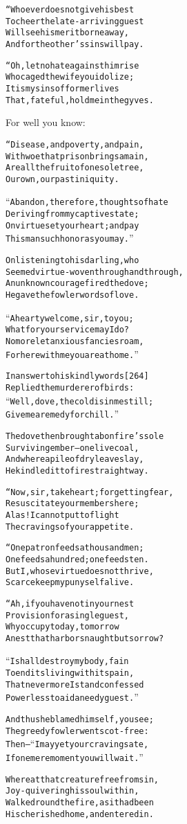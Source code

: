 \documentclass{article}
\renewenvironment{verbatim}{\begin{alltt}\normalfont\begin{centering}}{\end{centering}\end{alltt}}
\begin{document}
\begin{verbatim}
“Whoever does not give his best
To cheer the late-arriving guest
Will see his merit borne away,
And for the other's sins will pay.

“Oh, let no hate against him rise
Who caged the wife you idolize;
It is my sins of former lives
That, fateful, hold me in the gyves.
\end{verbatim}
For well you know:

\begin{verbatim}
“Disease, and poverty, and pain,
With woe that prison brings amain,
Are all the fruit of one sole tree,
Our own, our past iniquity.

“Abandon, therefore, thoughts of hate
Deriving from my captive state;
On virtue set your heart; and pay
This man such honor as you may.”

On listening to his darling, who
Seemed virtue-woven through and through,
An unknown courage fired the dove;
He gave the fowler words of love.

“A hearty welcome, sir, to you;
What for your service may I do?
No more let anxious fancies roam,
For here with me you are at home.”

In answer to his kindly words                           [264]
Replied the murderer of birds:
“Well, dove, the cold is in me still;
Give me a remedy for chill.”

The dove then brought a bonfire's sole
Surviving ember--one live coal,
And where a pile of dry leaves lay,
He kindled it to fire straightway.

“Now, sir, take heart; forgetting fear,
Resuscitate your members here;
Alas! I cannot put to flight
The cravings of your appetite.

“One patron feeds a thousand men;
One feeds a hundred; one feeds ten.
But I, whose virtue does not thrive,
Scarce keep my puny self alive.

“Ah, if you have not in your nest
Provision for a single guest,
Why occupy today, tomorrow
A nest that harbors naught but sorrow?

“I shall destroy my body, fain
To end its living with its pain,
That nevermore I stand confessed
Powerless to aid a needy guest.”

And thus he blamed himself, you see;
The greedy fowler went scot-free:
Then--“I may yet your craving sate,
If one mere moment you will wait.”

Whereat that creature free from sin,
Joy-quivering his soul within,
Walked round the fire, as it had been
His cherished home, and entered in.


\end{verbatim}
\end{document}
